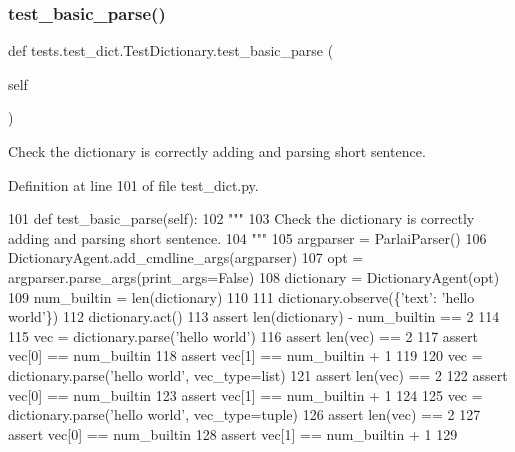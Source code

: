 \subsubsection{\texorpdfstring{test\+\_\+basic\+\_\+parse()}{test\_basic\_parse()}}
{\footnotesize\ttfamily def tests.\+test\+\_\+dict.\+Test\+Dictionary.\+test\+\_\+basic\+\_\+parse (\begin{DoxyParamCaption}\item[{}]{self }\end{DoxyParamCaption})}

\begin{DoxyVerb}Check the dictionary is correctly adding and parsing short sentence.
\end{DoxyVerb}
 

Definition at line 101 of file test\+\_\+dict.\+py.


\begin{DoxyCode}
101     \textcolor{keyword}{def }test\_basic\_parse(self):
102         \textcolor{stringliteral}{"""}
103 \textcolor{stringliteral}{        Check the dictionary is correctly adding and parsing short sentence.}
104 \textcolor{stringliteral}{        """}
105         argparser = ParlaiParser()
106         DictionaryAgent.add\_cmdline\_args(argparser)
107         opt = argparser.parse\_args(print\_args=\textcolor{keyword}{False})
108         dictionary = DictionaryAgent(opt)
109         num\_builtin = len(dictionary)
110 
111         dictionary.observe(\{\textcolor{stringliteral}{'text'}: \textcolor{stringliteral}{'hello world'}\})
112         dictionary.act()
113         \textcolor{keyword}{assert} len(dictionary) - num\_builtin == 2
114 
115         vec = dictionary.parse(\textcolor{stringliteral}{'hello world'})
116         \textcolor{keyword}{assert} len(vec) == 2
117         \textcolor{keyword}{assert} vec[0] == num\_builtin
118         \textcolor{keyword}{assert} vec[1] == num\_builtin + 1
119 
120         vec = dictionary.parse(\textcolor{stringliteral}{'hello world'}, vec\_type=list)
121         \textcolor{keyword}{assert} len(vec) == 2
122         \textcolor{keyword}{assert} vec[0] == num\_builtin
123         \textcolor{keyword}{assert} vec[1] == num\_builtin + 1
124 
125         vec = dictionary.parse(\textcolor{stringliteral}{'hello world'}, vec\_type=tuple)
126         \textcolor{keyword}{assert} len(vec) == 2
127         \textcolor{keyword}{assert} vec[0] == num\_builtin
128         \textcolor{keyword}{assert} vec[1] == num\_builtin + 1
129 
\end{DoxyCode}
\mbox{\label{classtests_1_1test__dict_1_1TestDictionary_ae017e72c578005310906979e15c51fe4}} 
